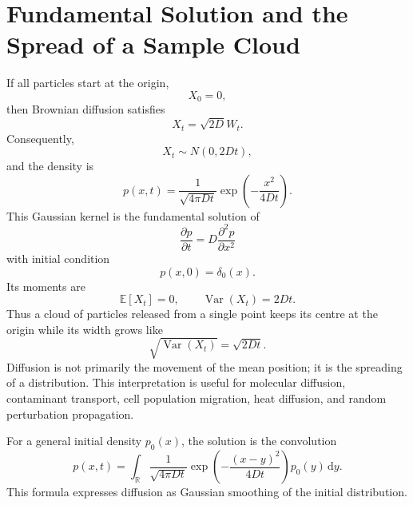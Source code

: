 \documentclass[11pt,a4paper]{article}
\numberwithin{equation}{section}
\newcommand{\R}{\mathbb{R}}
\newcommand{\E}{\mathbb{E}}
\newcommand{\dd}{\,\mathrm{d}}
\begin{document}
\section{Fundamental Solution and the Spread of a Sample Cloud}

If all particles start at the origin,
\begin{equation}
  X_0=0,
  \label{eq:origin-initial}
\end{equation}
then Brownian diffusion satisfies
\begin{equation}
  X_t=\sqrt{2D}W_t.
  \label{eq:brownian-solution}
\end{equation}
Consequently,
\begin{equation}
  X_t\sim N(0,2Dt),
  \label{eq:brownian-distribution}
\end{equation}
and the density is
\begin{equation}
  p(x,t)
  =
  \frac{1}{\sqrt{4\pi Dt}}
  \exp\left(-\frac{x^2}{4Dt}\right).
  \label{eq:gaussian-kernel}
\end{equation}
This Gaussian kernel is the fundamental solution of
\begin{equation}
  \frac{\partial p}{\partial t}
  =D\frac{\partial^2p}{\partial x^2}
  \label{eq:heat-fundamental}
\end{equation}
with initial condition
\begin{equation}
  p(x,0)=\delta_0(x).
  \label{eq:delta-initial}
\end{equation}
Its moments are
\begin{equation}
  \E[X_t]=0,
  \qquad
  \operatorname{Var}(X_t)=2Dt.
  \label{eq:brownian-moments}
\end{equation}
Thus a cloud of particles released from a single point keeps its centre at the origin while its width grows like
\begin{equation}
  \sqrt{\operatorname{Var}(X_t)}
  =\sqrt{2Dt}.
  \label{eq:diffusive-scale}
\end{equation}
Diffusion is not primarily the movement of the mean position; it is the spreading of a distribution. This interpretation is useful for molecular diffusion, contaminant transport, cell population migration, heat diffusion, and random perturbation propagation.

For a general initial density \(p_0(x)\), the solution is the convolution
\begin{equation}
  p(x,t)
  =
  \int_{\R}
  \frac{1}{\sqrt{4\pi Dt}}
  \exp\left(-\frac{(x-y)^2}{4Dt}\right)
  p_0(y)\dd y.
  \label{eq:heat-convolution}
\end{equation}
This formula expresses diffusion as Gaussian smoothing of the initial distribution.
\end{document}
